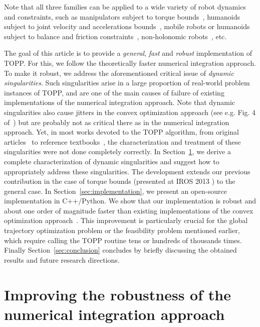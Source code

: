 \documentclass[9pt,technote]{IEEEtran}
\begin{document}
Note that all three families can be applied to a wide variety of robot
dynamics and constraints, such as manipulators subject to torque
bounds~\cite{BobX85ijrr}, humanoids subject to joint velocity and
accelerations bounds~\cite{KS12rss,Hau13rss}, mobile robots or
humanoids subject to balance and friction
constraints~\cite{PN12humanoids,Hau14icra}, non-holonomic
robots~\cite{BL01tac}, etc.

The goal of this article is to provide a \emph{general}, \emph{fast}
and \emph{robust} implementation of TOPP. For this, we follow the
theoretically faster numerical integration approach.  To make it
robust, we address the aforementioned critical issue of \emph{dynamic
  singularities}. Such singularities arise in a large proportion of
real-world problem instances of TOPP, and are one of the main causes
of failure of existing implementations of the numerical integration
approach. Note that dynamic singularities also cause jitters in the
convex optimization approach (see e.g. Fig. 4 of~\cite{VerX09tac}) but
are probably not as critical there as in the numerical integration
approach. Yet, in most works devoted to the TOPP algorithm, from
original articles~\cite{PJ87jra,SL92jdsmc,SY89tra,KS12rss} to
reference textbooks~\cite{ChoX05book}, the characterization and
treatment of these singularities were not done completely
correctly. In Section~\ref{sec:robust}, we derive a complete
characterization of dynamic singularities and suggest how to
appropriately address these singularities. The development extends our
previous contribution in the case of torque bounds (presented at IROS
2013 \cite{Pha13iros}) to the general case. In
Section~\ref{sec:implementation}, we present an open-source
implementation in C++/Python. We show that our implementation is
robust and about one order of magnitude faster than existing
implementations of the convex optimization
approach~\cite{VerX09tac,DebX13tr,Hau13rss}. This improvement is
particularly crucial for the global trajectory optimization problem or
the feasibility problem mentioned earlier, which require calling the
TOPP routine tens or hundreds of thousands times. Finally
Section~\ref{sec:conclusion} concludes by briefly discussing the
obtained results and future research directions.



\section{Improving the robustness of the\\numerical integration approach}
\label{sec:robust}
\end{document}
